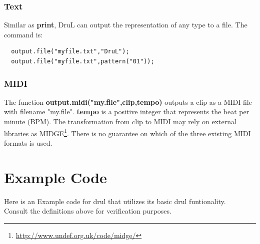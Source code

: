 \documentclass[11pt,twoside]{article}
\begin{document}
\subsubsection{Text}
Similar as \textbf{print}, DruL can output the representation of any type 
to a file. The command is:
\begin{verbatim}
  output.file("myfile.txt","DruL");
  output.file("myfile.txt",pattern("01"));
\end{verbatim}

\subsubsection{MIDI}
The function \textbf{output.midi("my.file",clip,tempo)} outputs a clip as a MIDI
file with filename "my.file". \textbf{tempo} is a positive integer that
represents the beat per minute (BPM). 
The transformation from clip to MIDI may rely
on external libraries as MIDGE\footnote{\url{http://www.undef.org.uk/code/midge/}}. There is no guarantee on which of the three existing MIDI formats is used.

\clearpage

\section{Example Code}

Here is an Example code for drul that utilizes its basic drul funtionality.\\
Consult the definitions above for verification purposes.
\end{document}
